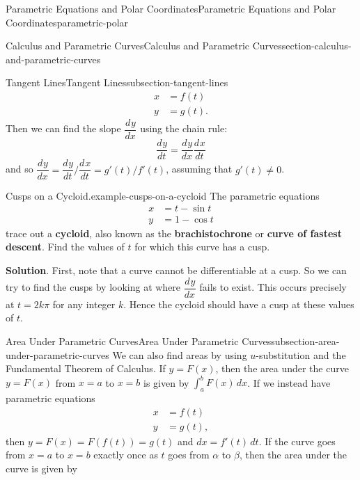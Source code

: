 \documentclass[oneside,10pt,]{book}
\newcommand{\terminology}[1]{\textbf{#1}}
\numberwithin{equation}{section}
\newcommand{\dv}[3][]{\dfrac{d^{#1} #2}{d #3^{#1}}}
\newcommand{\amp}{&}
\begin{document}
\begin{chapterptx}{Parametric Equations and Polar Coordinates}{}{Parametric Equations and Polar Coordinates}{}{}{parametric-polar}
\begin{sectionptx}{Calculus and Parametric Curves}{}{Calculus and Parametric Curves}{}{}{section-calculus-and-parametric-curves}
\begin{subsectionptx}{Tangent Lines}{}{Tangent Lines}{}{}{subsection-tangent-lines}
\begin{align*}
x \amp = f(t) \\
y \amp = g(t) \text{.}
\end{align*}
Then we can find the slope \(\dv{y}{x}\) using the chain rule:%
\begin{equation*}
\dv{y}{t} = \dv{y}{x}\dv{x}{t}
\end{equation*}
and so \(\dv{y}{x} = \dv{y}{t}/\dv{x}{t} = g'(t)/f'(t)\), assuming that \(g'(t)\neq0\).%
\begin{example}{Cusps on a Cycloid.}{example-cusps-on-a-cycloid}%
\hypertarget{p-1005}{}%
The parametric equations%
\begin{align*}
x \amp = t - \sin t \\
y \amp = 1 - \cos t 
\end{align*}
trace out a \terminology{cycloid}, also known as the \terminology{brachistochrone} or \terminology{curve of fastest descent}. Find the values of \(t\) for which this curve has a cusp.%
\par\smallskip%
\noindent\textbf{Solution}.\hypertarget{solution-203}{}\quad%
\hypertarget{p-1006}{}%
First, note that a curve cannot be differentiable at a cusp. So we can try to find the cusps by looking at where \(\dv{y}{x}\) fails to exist. This occurs precisely at \(t = 2k\pi\) for any integer \(k\). Hence the cycloid should have a cusp at these values of \(t\).%
\end{example}
\end{subsectionptx}
%
%
\typeout{************************************************}
\typeout{************************************************}
%
\begin{subsectionptx}{Area Under Parametric Curves}{}{Area Under Parametric Curves}{}{}{subsection-area-under-parametric-curves}
\hypertarget{p-1007}{}%
We can also find areas by using \(u\)-substitution and the Fundamental Theorem of Calculus. If \(y = F(x)\), then the area under the curve \(y=F(x)\) from \(x=a\) to \(x=b\) is given by \(\int_{a}^{b} F(x)\,dx\). If we instead have parametric equations%
\begin{align*}
x \amp = f(t) \\
y \amp = g(t), 
\end{align*}
then \(y = F(x) = F(f(t)) = g(t)\) and \(dx = f'(t)\,dt\). If the curve goes from \(x=a\) to \(x=b\) exactly once as \(t\) goes from \(\alpha\) to \(\beta\), then the area under the curve is given by%
\begin{equation*}

\end{equation*}
\end{subsectionptx}
\end{sectionptx}
\end{chapterptx}
\end{document}
